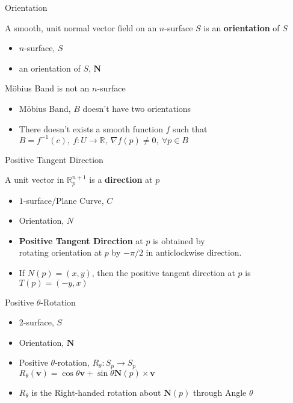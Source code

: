 \documentclass{beamer}
\begin{document}
\begin{frame}{Orientation}
\begin{definition}[Orientation]
	A smooth, unit normal vector field on an $n$-surface $S$ is an \textbf{orientation} of $S$
\end{definition}
\begin{definition}
\begin{itemize}
	\item $n$-surface, $S$
	\item an orientation of $S$, $\mathbf{N}$
\end{itemize}
\end{definition}
\begin{block}{M\"obius Band is not an $n$-surface}
\begin{itemize}
	\item M\"obius Band, $B$ doesn't have two orientations
	\item There doesn't exists a smooth function $f$ such that\\
		$B = f^{-1}(c),\ f : U \to \mathbb{R},\ \nabla f(p) \ne 0,\ \forall p \in B$
\end{itemize}
\end{block}
\end{frame}

\begin{frame}{Positive Tangent Direction}
\begin{definition}[direction]
	A unit vector in $\mathbb{R}_p^{n+1}$ is a \textbf{direction} at $p$
\end{definition}
\begin{definition}
\begin{itemize}
	\item $1$-surface/Plane Curve, $C$
	\item Orientation, $N$
	\item \textbf{Positive Tangent Direction} at $p$ is obtained by\\
		rotating orientation at $p$ by $-\pi/2$ in anticlockwise direction.
	\item If $N(p) = (x,y)$, then the positive tangent direction at $p$ is $T(p) = (-y,x)$ 
\end{itemize}
\end{definition}
\end{frame}

\begin{frame}{Positive $\theta$-Rotation}
\begin{definition}
\begin{itemize}
	\item $2$-surface, $S$
	\item Orientation, $\mathbf{N}$
	\item Positive $\theta$-rotation, $R_\theta : S_p \to S_p$\\
		$R_\theta(\mathbf{v}) = \cos \theta \mathbf{v} + \sin \theta \mathbf{N}(p) \times \mathbf{v}$
	\item $R_\theta$ is the Right-handed rotation about $\mathbf{N}(p)$ through Angle $\theta$
\end{itemize}
\end{definition}
\end{frame}
\end{document}
